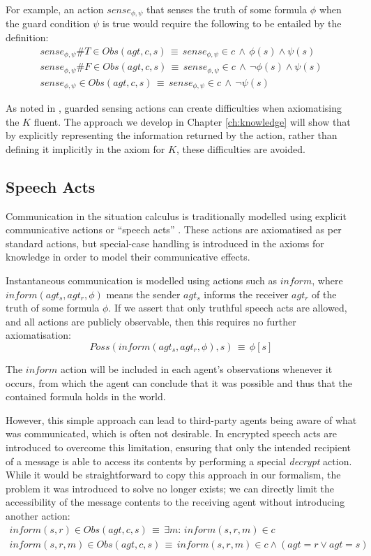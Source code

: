 For example, an action $sense_{\phi,\psi}$ that senses the truth
of some formula $\phi$ when the guard condition $\psi$ is true would
require the following to be entailed by the definition:\begin{gather*}
sense_{\phi,\psi}\#T\in Obs(agt,c,s)\,\equiv\, sense_{\phi,\psi}\in c\,\wedge\,\phi(s)\wedge\psi(s)\\
sense_{\phi,\psi}\#F\in Obs(agt,c,s)\,\equiv\, sense_{\phi,\psi}\in c\,\wedge\,\neg\phi(s)\wedge\psi(s)\\
sense_{\phi,\psi}\in Obs(agt,c,s)\,\equiv\, sense_{\phi,\psi}\in c\,\wedge\,\neg\psi(s)\end{gather*}


As noted in \citep{Petrick06thesis}, guarded sensing actions can
create difficulties when axiomatising the $K$ fluent. The approach
we develop in Chapter \ref{ch:knowledge} will show that by explicitly
representing the information returned by the action, rather than defining
it implicitly in the axiom for $K$, these difficulties are avoided.


\subsection{Speech Acts}

Communication in the situation calculus is traditionally modelled
using explicit communicative actions or {}``speech acts'' \citep{shapiro01casl_feat_inter,shapiro07sc_goal_change}.
These actions are axiomatised as per standard actions, but special-case
handling is introduced in the axioms for knowledge in order to model
their communicative effects.

Instantaneous communication is modelled using actions such as $inform$,
where $inform(agt_{s},agt_{r},\phi)$ means the sender $agt_{s}$
informs the receiver $agt_{r}$ of the truth of some formula $\phi$.
If we assert that only truthful speech acts are allowed, and all actions
are publicly observable, then this requires no further axiomatisation:\[
Poss(inform(agt_{s},agt_{r},\phi),s)\,\equiv\,\phi[s]\]


The $inform$ action will be included in each agent's observations
whenever it occurs, from which the agent can conclude that it was
possible and thus that the contained formula holds in the world.

However, this simple approach can lead to third-party agents being
aware of what was communicated, which is often not desirable. In \citep{shapiro01casl_feat_inter}
encrypted speech acts are introduced to overcome this limitation,
ensuring that only the intended recipient of a message is able to
access its contents by performing a special \emph{decrypt} action.
While it would be straightforward to copy this approach in our formalism,
the problem it was introduced to solve no longer exists; we can directly
limit the accessibility of the message contents to the receiving agent
without introducing another action:\begin{gather*}
inform(s,r)\in Obs(agt,c,s)\,\equiv\,\exists m:\, inform(s,r,m)\in c\\
inform(s,r,m)\in Obs(agt,c,s)\,\equiv\, inform(s,r,m)\in c\wedge\left(agt=r\vee agt=s\right)\end{gather*}


